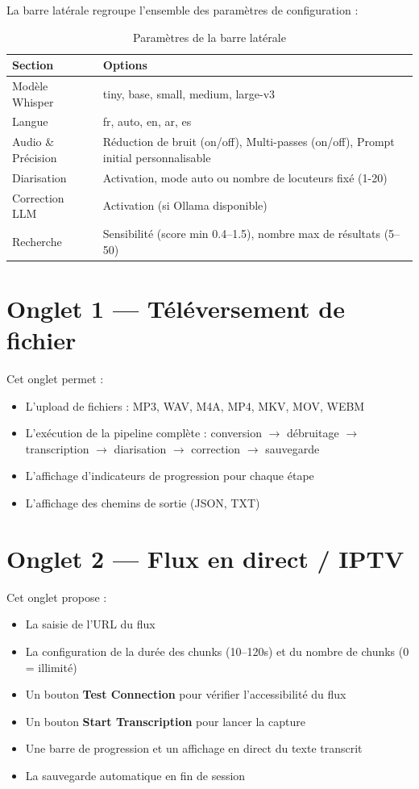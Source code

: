 \documentclass[12pt,a4paper]{report}
\begin{document}
La barre latérale regroupe l'ensemble des paramètres de configuration :

\begin{table}[H]
    \centering
    \caption{Paramètres de la barre latérale}
    \label{tab:sidebar}
    \begin{tabular}{@{} l p{8cm} @{}}
        \toprule
        \textbf{Section} & \textbf{Options} \\
        \midrule
        Modèle Whisper & tiny, base, small, medium, large-v3 \\
        Langue & fr, auto, en, ar, es \\
        Audio \& Précision & Réduction de bruit (on/off), Multi-passes (on/off), Prompt initial personnalisable \\
        Diarisation & Activation, mode auto ou nombre de locuteurs fixé (1-20) \\
        Correction LLM & Activation (si Ollama disponible) \\
        Recherche & Sensibilité (score min 0.4--1.5), nombre max de résultats (5--50) \\
        \bottomrule
    \end{tabular}
\end{table}

\section{Onglet 1 — Téléversement de fichier}

Cet onglet permet :
\begin{itemize}
    \item L'upload de fichiers : MP3, WAV, M4A, MP4, MKV, MOV, WEBM
    \item L'exécution de la pipeline complète : conversion $\rightarrow$ débruitage $\rightarrow$ transcription $\rightarrow$ diarisation $\rightarrow$ correction $\rightarrow$ sauvegarde
    \item L'affichage d'indicateurs de progression pour chaque étape
    \item L'affichage des chemins de sortie (JSON, TXT)
\end{itemize}

\section{Onglet 2 — Flux en direct / IPTV}

Cet onglet propose :
\begin{itemize}
    \item La saisie de l'URL du flux
    \item La configuration de la durée des chunks (10--120s) et du nombre de chunks (0 = illimité)
    \item Un bouton \textbf{Test Connection} pour vérifier l'accessibilité du flux
    \item Un bouton \textbf{Start Transcription} pour lancer la capture
    \item Une barre de progression et un affichage en direct du texte transcrit
    \item La sauvegarde automatique en fin de session
\end{itemize}
\end{document}
